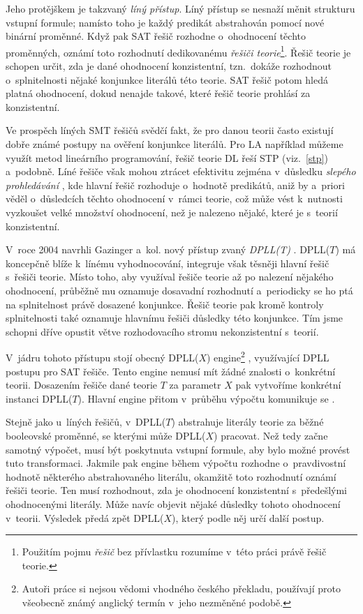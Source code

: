 Jeho protějškem je takzvaný \emph{líný přístup}. Líný přístup se nesnaží měnit strukturu vstupní formule; namísto toho je každý predikát abstrahován pomocí nové binární proměnné. Když pak SAT řešič rozhodne o~ohodnocení těchto proměnných, oznámí toto rozhodnutí dedikovanému \emph{řešiči teorie}\footnote{Použitím pojmu \emph{řešič} bez přívlastku rozumíme v~této práci právě řešič teorie.}. Řešič teorie je schopen určit, zda je dané ohodnocení konzistentní, tzn.~dokáže rozhodnout o~splnitelnosti nějaké konjunkce literálů této teorie. SAT řešič potom hledá platná ohodnocení, dokud nenajde takové, které řešič teorie prohlásí za konzistentní.

Ve prospěch líných SMT řešičů svědčí fakt, že pro danou teorii často existují dobře známé postupy na ověření konjunkce literálů. Pro LA například můžeme využít metod lineárního programování, řešič teorie DL řeší STP (viz.~\ref{stp}) a~podobně. Líné řešiče však mohou ztrácet efektivitu zejména v~důsledku \emph{slepého prohledávání} \cite{Moura04}, kde hlavní řešič rozhoduje o~hodnotě predikátů, aniž by a~priori věděl o~důsledcích těchto ohodnocení v~rámci teorie, což může vést k~nutnosti vyzkoušet velké množství ohodnocení, než je nalezeno nějaké, které je s~teorií konzistentní.

V~roce 2004 navrhli Gazinger a~kol. nový přístup zvaný \emph{DPLL(T)} \cite{Gazinger04}. DPLL($T$) má koncepčně blíže k~línému vyhodnocování, integruje však těsněji hlavní řešič s~řešiči teorie. Místo toho, aby využíval řešiče teorie až po nalezení nějakého ohodnocení, průběžně mu oznamuje dosavadní rozhodnutí a~periodicky se ho ptá na splnitelnost právě dosazené konjunkce. Řešič teorie pak kromě kontroly splnitelnosti také oznamuje hlavnímu řešiči důsledky této konjunkce. Tím jsme schopni dříve opustit větve rozhodovacího stromu nekonzistentní s~teorií. 

V~jádru tohoto přístupu stojí obecný DPLL($X$) engine\footnote{Autoři práce si nejsou vědomi vhodného českého překladu, používají proto všeobecně známý anglický termín v~jeho nezměněné podobě.} , využívající DPLL \cite{Davis60} postupu pro SAT řešiče. Tento engine nemusí mít žádné znalosti o~konkrétní teorii. Dosazením řešiče \Solver dané teorie $T$ za parametr $X$ pak vytvoříme konkrétní instanci DPLL($T$). Hlavní engine přitom v~průběhu výpočtu komunikuje se \Solver.

Stejně jako u~líných řešičů, v~DPLL($T$) abstrahuje \Solver literály teorie za běžné booleovské proměnné, se kterými může DPLL($X$) pracovat. Než tedy začne samotný výpočet, musí být \Solver poskytnuta vstupní formule, aby bylo možné provést tuto transformaci. Jakmile pak engine během výpočtu rozhodne o~pravdivostní hodnotě některého abstrahovaného literálu, okamžitě toto rozhodnutí oznámí řešiči teorie. Ten musí rozhodnout, zda je ohodnocení konzistentní s~předešlými ohodnocenými literály. Může navíc objevit nějaké důsledky tohoto ohodnocení v~teorii. Výsledek \Solver předá zpět DPLL($X$), který podle něj určí další postup. 

